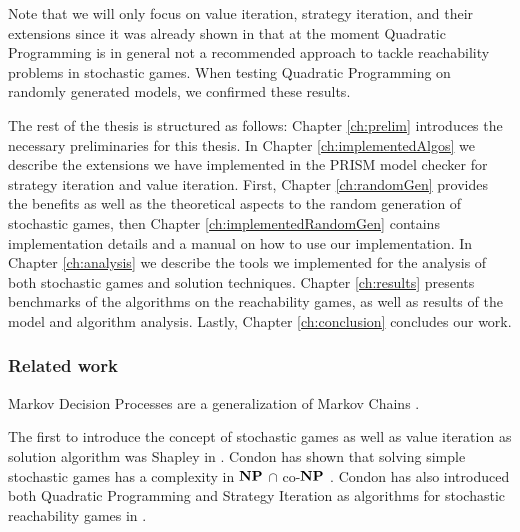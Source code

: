 Note that we will only focus on value iteration, strategy iteration, and their extensions since it was already shown in \cite{gandalf} that at the moment
Quadratic Programming is in general not a recommended approach to tackle reachability problems in stochastic games.
When testing Quadratic Programming on randomly generated models, we confirmed these results.


The rest of the thesis is structured as follows:
Chapter \ref{ch:prelim} introduces the necessary preliminaries for this thesis.
In Chapter \ref{ch:implementedAlgos} we describe the extensions we have implemented in the PRISM model checker for strategy iteration and value iteration.
First, Chapter \ref{ch:randomGen} provides the benefits as well as the theoretical aspects to the random generation of stochastic games,
then Chapter \ref{ch:implementedRandomGen} contains implementation details and a manual on how to use our implementation.
In Chapter \ref{ch:analysis} we describe the tools we implemented for the analysis of both stochastic games and solution techniques.
Chapter \ref{ch:results} presents benchmarks of the algorithms on the reachability games, as well as results of the model and algorithm analysis.
Lastly, Chapter \ref{ch:conclusion} concludes our work.

\subsubsection*{Related work}
Markov Decision Processes are a generalization of Markov Chains \cite{Puterman} \cite[Ch.~11]{introProb}.

The first to introduce the concept of stochastic games as well as value iteration as solution algorithm was Shapley in \cite{shapley}.
Condon has shown that solving simple stochastic games has a complexity in $\mathbf{NP}$ $\cap$ co-$\mathbf{NP}$ \cite{condonComplexity}.
Condon has also introduced both Quadratic Programming and Strategy Iteration as algorithms for stochastic reachability games in \cite{condonQP}. 

